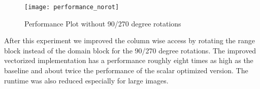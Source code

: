 \begin{figure}[H]
  \centering
  \texttt{[image: performance\_norot]}
  \caption{Performance Plot without 90/270 degree rotations}
  \label{fig:perf_40_41}
\end{figure}


After this experiment we improved the column wise access by rotating the range
block instead of the domain block for the 90/270 degree rotations. The improved
vectorized implementation has a performance roughly eight times as high as the
baseline and about twice the performance of the scalar optimized version. The
runtime was also reduced especially for large images.

